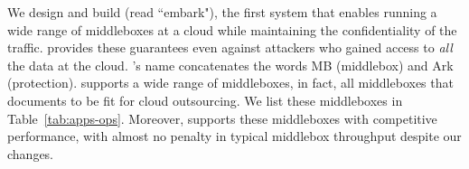 %    
%    
% 
     
     
     
  
    We design and build \sys (read ``embark"), the first system that enables running a wide range of middleboxes at a cloud  while maintaining the confidentiality of the traffic. \sys provides these guarantees even against attackers who gained access to {\em all} the data at the cloud.  \sys's name concatenates the words MB (middlebox) and Ark (protection). \sys supports a wide range of middleboxes, in fact, all middleboxes that~\cite{aplomb} documents to be fit for cloud outsourcing. We list these middleboxes in Table~\ref{tab:apps-ops}. Moreover, \sys supports these middleboxes with competitive performance, with almost no penalty in typical middlebox throughput despite our changes. 
    
